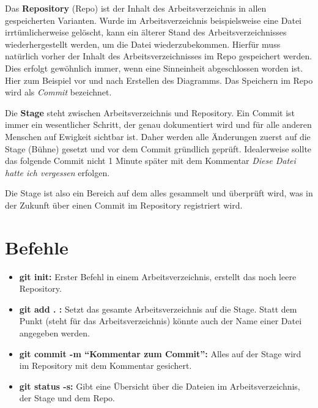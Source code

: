 \documentclass[11pt]{article}
\begin{document}
Das \textbf{Repository} (Repo) ist der Inhalt des Arbeitsverzeichnis in allen
gespeicherten Varianten. Wurde im Arbeitsverzeichnis beispielsweise
eine Datei irrtümlicherweise gelöscht, kann ein älterer Stand des
Arbeitsverzeichnisses wiederhergestellt werden, um die Datei
wiederzubekommen. Hierfür muss natürlich vorher der Inhalt des
Arbeitsverzeichnisses im Repo gespeichert werden. Dies erfolgt
gewöhnlich immer, wenn eine Sinneinheit abgeschlossen worden ist. Hier
zum Beispiel vor und nach Erstellen des Diagramms. Das Speichern im
Repo wird als \textsl{Commit} bezeichnet.

Die \textbf{Stage} steht zwischen Arbeitsverzeichnis und Repository.
Ein Commit ist immer ein wesentlicher Schritt, der genau dokumentiert
wird und für alle anderen Menschen auf Ewigkeit sichtbar ist. Daher
werden alle Änderungen zuerst auf die Stage (Bühne) gesetzt und vor
dem Commit gründlich geprüft. Idealerweise sollte das folgende Commit
nicht 1 Minute später mit dem Kommentar \textsl{Diese Datei hatte ich
  vergessen} erfolgen.

Die Stage ist also ein Bereich auf dem alles gesammelt und überprüft
wird, was in der Zukunft über einen Commit im  Repository registriert wird.



\section{Befehle}
\begin{itemize}
\item \textbf{git init:} Erster Befehl in einem Arbeitsverzeichnis,
  erstellt das noch leere Repository.
\item \textbf{git add . :} Setzt das gesamte Arbeitsverzeichnis auf
  die Stage. Statt dem Punkt (steht für das Arbeitsverzeichnis) könnte
  auch der Name einer Datei angegeben werden.
\item \textbf{git commit -m \enquote{Kommentar zum Commit}:} Alles auf
  der Stage wird im Repository mit dem Kommentar gesichert.
\item \textbf{git status -s:} Gibt eine Übersicht über die Dateien im Arbeitsverzeichnis, der Stage und dem Repo. 

\end{itemize}
\end{document}
